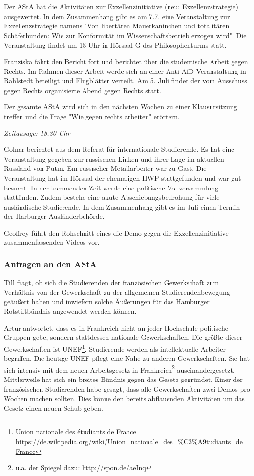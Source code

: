 \documentclass[ngerman,headheight=70pt]{scrartcl}
\begin{document}
    Der AStA hat die Aktivitäten zur Exzellenzinitiative (neu: Exzellenzstrategie)
    ausgewertet. In dem Zusammenhang gibt es am 7.7. eine Veranstaltung zur
    Exzellenzstrategie namens "Von libertären Mauerkaninchen und totalitären
    Schäferhunden: Wie zur Konformität im Wissenschaftsbetrieb erzogen wird".
    Die Veranstaltung findet um 18 Uhr in Hörsaal G des Philosophenturms statt.

    Franziska fährt den Bericht fort und berichtet über die studentische Arbeit
    gegen Rechts. Im Rahmen dieser Arbeit werde sich an einer Anti-AfD-Veranstaltung
    in Rahlstedt beteiligt und Flugblätter verteilt.
    Am 5. Juli findet der vom Ausschuss gegen Rechts organisierte Abend gegen
    Rechts statt.

    Der gesamte AStA wird sich in den nächsten Wochen zu einer Klausursitzung
    treffen und die Frage "Wie gegen rechts arbeiten" erörtern.

    \textit{Zeitansage: 18.30 Uhr}

    Golnar berichtet aus dem Referat für internationale Studierende. Es hat eine
    Veranstaltung gegeben zur russischen Linken und ihrer Lage im aktuellen Russland
    von Putin. Ein russischer Metallarbeiter war zu Gast. Die Veranstaltung hat
    im Hörsaal der ehemaligen HWP stattgefunden und war gut besucht.
    In der kommenden Zeit werde eine politische Vollversammlung stattfinden.
    Zudem bestehe eine akute Abschiebungsbedrohung für viele ausländische
    Studierende. In dem Zusammenhang gibt es im Juli einen Termin der Harburger
    Ausländerbehörde.

    Geoffrey führt den Rohschnitt eines die Demo gegen die Exzellenzinitiative
    zusammenfassenden Videos vor.

    \subsubsection{Anfragen an den AStA}

    Till fragt, ob sich die Studierenden der französischen Gewerkschaft zum
    Verhältnis von der Gewerkschaft zu der allgemeinen Studierendenbewegung
    geäußert haben und inwiefern solche Äußerungen für das Hamburger Rotstiftbündnis
    angewendet werden können.

    Artur antwortet, dass es in Frankreich nicht an jeder Hochschule politische
    Gruppen gebe, sondern stattdessen nationale Gewerkschaften. Die größte
    dieser Gewerkschaften ist UNEF\footnote{Union nationale des étudiants de France\\
    \url{https://de.wikipedia.org/wiki/Union\_nationale\_des\_\%C3\%A9tudiants\_de\_France}}.
    Studierende werden als intellektuelle Arbeiter begriffen. Die heutige UNEF
    pflegt eine Nähe zu anderen Gewerkschaften. Sie hat sich intensiv mit dem
    neuen Arbeitsgesetz in Frankreich\footnote{u.a. der Spiegel dazu:
    \url{http://spon.de/aeInq}}
    auseinandergesetzt. Mittlerweile hat sich ein breites Bündnis gegen das Gesetz
    gegründet. Einer der französischen Studierenden habe gesagt, dass alle
    Gewerkschaften zwei Demos pro Wochen machen sollten. Dies könne den bereits
    abflauenden Aktivitäten um das Gesetz einen neuen Schub geben.
\end{document}
